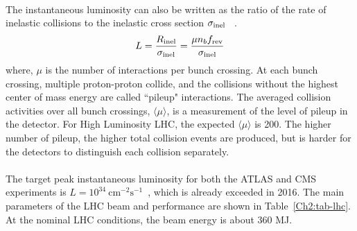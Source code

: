 \paragraph{}
The instantaneous luminosity can also be written as the ratio of the rate of inelastic collisions to the inelastic cross section $\sigma_{\rm inel}$ ~\cite{lumi-paper}. 
\begin{equation}
\label{Ch2:eq-lumi2}
L = \frac{R_{\rm inel}}{\sigma_{\rm inel}} = \frac{\mu n_b f_{\rm rev}}{\sigma_{\rm inel}}
\end{equation}
where, $\mu$ is the number of interactions per bunch crossing. At each bunch crossing, multiple proton-proton collide, and the collisions without the highest center of mass energy are called ``pileup" interactions. The averaged collision activities over all bunch crossings, $\langle \mu \rangle$, is a measurement of the level of pileup in the detector. For High Luminosity LHC, the expected $\langle \mu \rangle$ is 200. The higher number of pileup, the higher total collision events are produced, but is harder for the detectors to distinguish each collision separately.


\paragraph{}
The target peak instantaneous luminosity for both the ATLAS and CMS experiments is $L=10^{34}~\text{cm}^{-2}\text{s}^{-1}$~\cite{LHCPaper}, which is already exceeded in 2016. The main parameters of the LHC beam and performance are shown in Table~\ref{Ch2:tab-lhc}. At the nominal LHC conditions, the beam energy is about 360 MJ.

